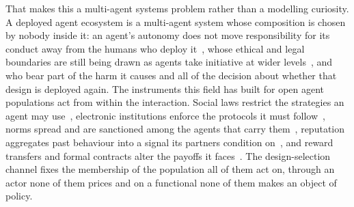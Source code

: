 

That makes this a multi-agent systems problem rather than a modelling
curiosity. A deployed agent ecosystem is a multi-agent system whose
composition is chosen by nobody inside it: an agent's autonomy does not move
responsibility for its conduct away from the humans who deploy
it~\citep{chan2023harms}, whose ethical and legal boundaries are still being
drawn as agents take initiative at wider levels~\citep{wellman2017ethical},
and who bear part of the harm it causes and all of the decision about whether
that design is deployed again. The instruments this field has built for open
agent populations act from within the interaction. Social laws restrict the
strategies an agent may use~\citep{shoham1995social}, electronic institutions
enforce the protocols it must follow~\citep{arcos2005electronic}, norms spread
and are sanctioned among the agents that carry
them~\citep{morrismartin2019norm,nardin2016sanctions}, reputation aggregates
past behaviour into a signal its partners condition
on~\citep{huynh2006integrated}, and reward transfers and formal contracts
alter the payoffs it faces~\citep{willis2024minimal,haupt2024contracts}. The
design-selection channel fixes the membership of the population all of them
act on, through an actor none of them prices and on a functional none of them
makes an object of policy.


